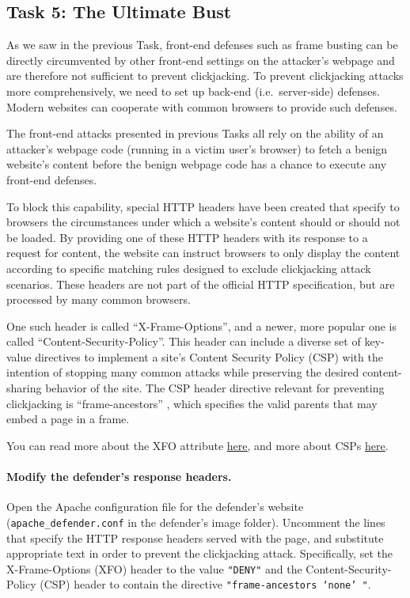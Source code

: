 
\subsection{Task 5: The Ultimate Bust}
As we saw in the previous Task, front-end defenses such as frame busting
can be directly circumvented by other front-end settings on the
attacker's webpage and are therefore not sufficient to prevent
clickjacking. To prevent clickjacking attacks more comprehensively, we
need to set up back-end (i.e.\ server-side) defenses.  Modern websites
can cooperate with common browsers to provide such defenses.

The front-end attacks presented in previous Tasks all rely on the
ability of an attacker's webpage code (running in a victim user's
browser) to fetch a benign website's content before the benign webpage
code has a chance to execute any front-end defenses. 

To block this capability, special HTTP headers have
been created that specify to browsers the 
circumstances under which a website's content should or should not be loaded.
By providing one of these HTTP headers with its response to a
request for content, the website can instruct
browsers to only display the content according to specific matching
rules designed to exclude clickjacking attack scenarios.
These headers are not part of the official HTTP specification,
but are processed by many common browsers.

One such header is called ``X-Frame-Options'',
and a newer, more popular one is called ``Content-Security-Policy''. 
This header can
include a diverse set of key-value directives to implement a site's Content Security
Policy (CSP) with the intention of stopping many common attacks while
preserving the desired content-sharing behavior of the site.  The CSP header
directive relevant for preventing clickjacking is ``frame-ancestors'' ,
which specifies the valid parents that may embed a page in a frame.

You can read more about the XFO attribute
\underline{\href{https://developer.mozilla.org/en-US/docs/Web/HTTP/Headers/X-Frame-Options}{here}},
and more about CSPs
\underline{\href{https://developer.mozilla.org/en-US/docs/Web/HTTP/CSP}{here}}.

\paragraph{Modify the defender's response headers.} Open the Apache
configuration file for the defender's website
(\texttt{apache\_defender.conf} in the defender's image folder).
Uncomment the lines that specify the HTTP response headers served with
the page, and substitute appropriate text in order to prevent the
clickjacking attack.  Specifically, set the X-Frame-Options (XFO) header
to the value \texttt{"DENY"} and the Content-Security-Policy (CSP)
header to contain the directive \texttt{"frame-ancestors `none' "}.

